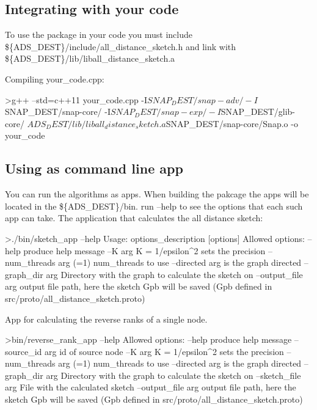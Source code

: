 \subsection*{Integrating with your code}

To use the package in your code you must include \$\{A\+D\+S\+\_\+\+D\+E\+S\+T\}/include/all\+\_\+distance\+\_\+sketch.h and link with \$\{A\+D\+S\+\_\+\+D\+E\+S\+T\}/lib/liball\+\_\+distance\+\_\+sketch.a

Compiling your\+\_\+code.\+cpp\+:

\begin{DoxyVerb}>g++ --std=c++11  your_code.cpp -I${SNAP_DEST}/snap-adv/ -I${SNAP_DEST}/snap-core/ -I${SNAP_DEST}/snap-exp/ -I${SNAP_DEST}/glib-core/  ${ADS_DEST}/lib/liball_distance_sketch.a ${SNAP_DEST}/snap-core/Snap.o  -o your_code
\end{DoxyVerb}


\subsection*{Using as command line app}

You can run the algorithms as apps. When building the pakcage the apps will be located in the \$\{A\+D\+S\+\_\+\+D\+E\+S\+T\}/bin. run --help to see the options that each such app can take. The application that calculates the all distance sketch\+: \begin{DoxyVerb}>./bin/sketch_app --help
Usage: options_description [options]
Allowed options:
  --help                 produce help message
  --K arg                K = 1/epsilon^2 sets the precision
  --num_threads arg (=1) num_threads to use
  --directed arg         is the graph directed
  --graph_dir arg        Directory with the graph to calculate the sketch on
  --output_file arg      output file path, here the sketch Gpb will be saved 
                         (Gpb defined in src/proto/all_distance_sketch.proto)
\end{DoxyVerb}


App for calculating the reverse ranks of a single node. \begin{DoxyVerb}>bin/reverse_rank_app --help
    Allowed options:
  --help                 produce help message
  --source_id arg        id of source node
  --K arg                K = 1/epsilon^2 sets the precision
  --num_threads arg (=1) num_threads to use
  --directed arg         is the graph directed
  --graph_dir arg        Directory with the graph to calculate the sketch on
  --sketch_file arg      File with the calculated sketch
  --output_file arg      output file path, here the sketch Gpb will be saved 
                         (Gpb defined in src/proto/all_distance_sketch.proto)\end{DoxyVerb}
 